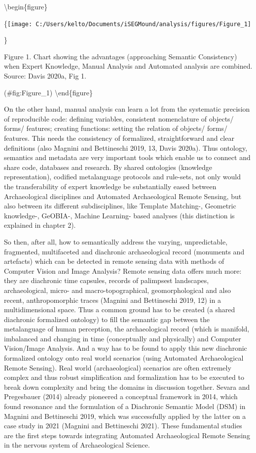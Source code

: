 \documentclass[
]{article}
\begin{document}
\textbackslash begin\{figure\}

\{\centering \texttt{[image: C:/Users/kelto/Documents/iSEGMound/analysis/figures/Figure\_1]}

\}

\caption{Figure 1. Chart showing the advantages (approaching Semantic Consistency) when Expert Knowledge, Manual Analysis and Automated analysis are combined. Source: Davis 2020a, Fig 1.}

(\#fig:Figure\_1)
\textbackslash end\{figure\}

On the other hand, manual analysis can learn a lot from the systematic precision of reproducible code: defining variables, consistent nomenclature of objects/ forms/ features; creating functions: setting the relation of objects/ forms/ features. This needs the consistency of formalized, straightforward and clear definitions (also Magnini and Bettineschi 2019, 13, Davis 2020a). Thus ontology, semantics and metadata are very important tools which enable us to connect and share code, databases and research. By shared ontologies (knowledge representation), codified metalanguage protocols and rule-sets, not only would the transferability of expert knowledge be substantially eased between Archaeological disciplines and Automated Archaeological Remote Sensing, but also between its different subdisciplines, like Template Matching-, Geometric knowledge-, GeOBIA-, Machine Learning- based analyses (this distinction is explained in chapter 2).

So then, after all, how to semantically address the varying, unpredictable, fragmented, multifaceted and diachronic archaeological record (monuments and artefacts) which can be detected in remote sensing data with methods of Computer Vision and Image Analysis? Remote sensing data offers much more: they are diachronic time capsules, records of palimpsest landscapes, archaeological, micro- and macro-topographical, geomorphological and also recent, anthropomorphic traces (Magnini and Bettineschi 2019, 12) in a multidimensional space. Thus a common ground has to be created (a shared diachronic formalized ontology) to fill the semantic gap between the metalanguage of human perception, the archaeological record (which is manifold, imbalanced and changing in time (conceptually and physically) and Computer Vision/Image Analysis. And a way has to be found to apply this new diachronic formalized ontology onto real world scenarios (using Automated Archaeological Remote Sensing). Real world (archaeological) scenarios are often extremely complex and thus robust simplification and formalization has to be executed to break down complexity and bring the domains in discussion together. Sevara and Pregesbauer (2014) already pioneered a conceptual framework in 2014, which found resonance and the formulation of a Diachronic Semantic Model (DSM) in Magnini and Bettineschi 2019, which was successfully applied by the latter on a case study in 2021 (Magnini and Bettineschi 2021). These fundamental studies are the first steps towards integrating Automated Archaeological Remote Sensing in the nervous system of Archaeological Science.
\end{document}
